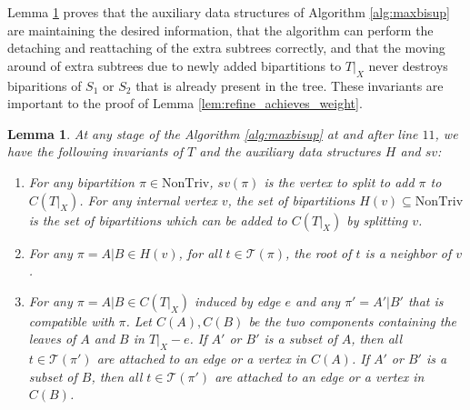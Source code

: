 \documentclass{bmcart}
\newcommand{\ntriv}{\mathrm{NonTriv}}
\theoremstyle{mystyle}
\newtheorem{lemma}{Lemma}
\theoremstyle{proofstyle}
\begin{document}
Lemma \ref{lem:invariants} proves that the auxiliary data structures of Algorithm \ref{alg:maxbisup} are maintaining the desired information, that the algorithm can perform the detaching and reattaching of the extra subtrees correctly, and that the moving around of extra subtrees due to newly added bipartitions to $T|_X$ never destroys biparitions of $S_1$ or $S_2$ that is already present in the tree. These invariants are important to the proof of Lemma \ref{lem:refine_achieves_weight}.
\begin{lemma} \label{lem:invariants}
    At any stage of the Algorithm \ref{alg:maxbisup} at and after line $11$, we have the following invariants of $T$ and the auxiliary data structures $H$ and $sv$:
        \begin{enumerate}
        \item For any bipartition $\pi \in \ntriv $, $sv(\pi)$ is the vertex to split to add $\pi$ to $C(T|_X)$. For any internal vertex $v$, the set of bipartitions $H(v) \subseteq \ntriv $ is the set of bipartitions which can be added to $C(T|_X)$ by splitting $v$.       
        \item For any $\pi = A|B \in H(v)$, for all $t \in \mathcal{T}(\pi)$, the root of $t$ is a neighbor of $v$.        
        \item For any $\pi = A|B \in C(T|_X)$ induced by edge $e$ and any $\pi' = A'|B'$ that is compatible with $\pi$. Let $C(A), C(B)$ be the two components containing the leaves of $A$ and $B$ in $T|_X - e$. If $A'$ or $B'$ is a subset of $A$, then all $t \in \mathcal{T}(\pi')$ are attached to an edge or a vertex in $C(A)$. If $A'$ or $B'$ is a subset of $B$, then all $t \in \mathcal{T}(\pi')$ are attached to an edge or a vertex in $C(B)$. 
    \end{enumerate}
\end{lemma}
\end{document}
